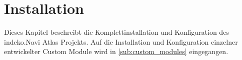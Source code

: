 \tableofcontents

\newpage
\listoffigures
\thispagestyle{empty}

\glsaddall
{}
\printglossary[type=\acronymtype,title = Abkürzungsverzeichnis]

\newpage
\restoregeometry
{}




\section{Installation}
Dieses Kapitel beschreibt die Komplettinstallation und Konfiguration des \acrshort{indeko}.Navi Atlas Projekts. Auf die Installation und Konfiguration einzelner entwickelter Custom Module wird in \cref{sub:custom_modules} eingegangen.


